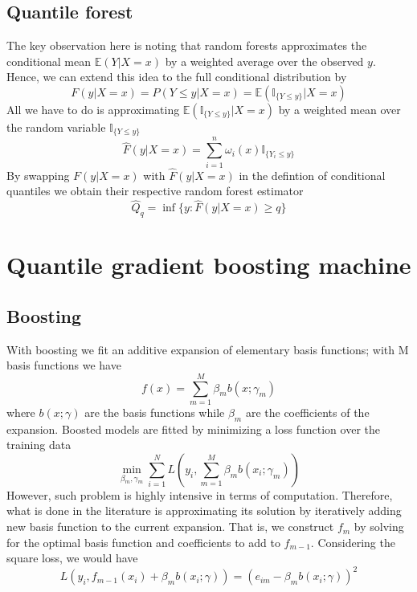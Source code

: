 \subsection{Quantile forest}
The key observation here is noting that random forests approximates the conditional mean $\mathbb{E}(Y|X=x)$ by a weighted average over the observed $y$.
Hence, we can extend this idea to the full conditional distribution by
\begin{equation}
    F(y|X=x)=P(Y\leq y|X=x)=\mathbb{E}(\mathbb{I}_{\{Y\leq y\}}|X=x)
\end{equation}
All we have to do is approximating $\mathbb{E}(\mathbb{I}_{\{Y\leq y\}}|X=x)$ by a weighted mean over the random variable $\mathbb{I}_{\{Y\leq y\}}$
\begin{equation}
    \hat{F}(y|X=x)=\sum\limits_{i=1}^{n}\omega_i(x)\mathbb{I}_{\{Y_i\leq y\}}
\end{equation}
By swapping $F(y|X=x)$ with $\hat{F}(y|X=x)$ in the defintion of conditional quantiles we obtain their respective random forest estimator
\begin{equation}
    \hat{Q}_q=\inf\{y:\hat{F}(y|X=x)\geq q\}
\end{equation}


\section{Quantile gradient boosting machine}
\subsection{Boosting}
With boosting we fit an additive expansion of elementary basis functions; with M basis functions we have 
\begin{equation}
    f(x)=\sum\limits_{m=1}^{M}\beta_m b(x;\gamma_m)
\end{equation}
where $b(x;\gamma)$ are the basis functions while $\beta_m$ are the coefficients of the expansion.
Boosted models are fitted by minimizing a loss function over the training data
\begin{equation}
    \min_{\beta_m, \gamma_m}\sum\limits_{i=1}^{N}L\left(y_i, \sum\limits_{m=1}^M \beta_m b(x_i;\gamma_m)\right)
\end{equation}
However, such problem is highly intensive in terms of computation. Therefore, what is done in the literature is approximating its solution by iteratively adding new basis function to the current expansion. That is, we construct $f_m$ by solving for the optimal basis function and coefficients to add to $f_{m-1}$. Considering the square loss, we would have
\begin{equation}
    L(y_i, f_{m-1}(x_i)+\beta_m b(x_i;\gamma))=(e_{im}-\beta_m b(x_i;\gamma))^2
\end{equation}

